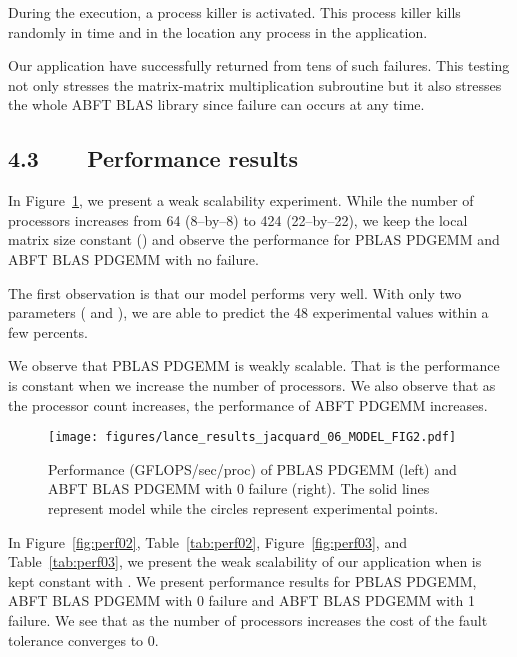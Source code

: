 \documentclass[pdftex,11pt]{article}
\begin{document}
During the execution, a process killer is activated.  This process
killer kills randomly in time and in the location any process in the
application.

Our application have successfully returned from tens of such failures.
This testing not only stresses the matrix-matrix multiplication
subroutine but it also stresses the whole ABFT BLAS library since
failure can occurs at any time.


\subsection*{\color{DodgerBlue4} 4.3~~~~Performance results}

In Figure~\ref{fig:perf01}, we present a weak scalability experiment.
While the number of processors increases from 64 (8--by--8) to 424
(22--by--22), we keep the local matrix size constant () and observe the performance for PBLAS PDGEMM and ABFT
BLAS PDGEMM with no failure.

The first observation is that our model performs very well. With only
two parameters ( and ), we are able to predict the 48
experimental values within a few percents.

We observe that PBLAS PDGEMM is weakly scalable. That is the
performance is constant when we increase the number of processors. We
also observe that as the processor count increases, the performance of
ABFT PDGEMM increases.

\begin{figure}
  \color{DodgerBlue4}
  \begin{center}
    \texttt{[image: figures/lance\_results\_jacquard\_06\_MODEL\_FIG2.pdf]}
    \color{DodgerBlue4}
    \caption{\label{fig:perf01} \color{black} Performance
      (GFLOPS/sec/proc) of PBLAS PDGEMM (left) and ABFT BLAS PDGEMM
      with 0 failure (right).  The solid lines represent model while
      the circles represent experimental points.  }
  \end{center}
\end{figure}

In Figure~\ref{fig:perf02}, Table~\ref{tab:perf02},
Figure~\ref{fig:perf03}, and Table~\ref{tab:perf03}, we present the
weak scalability of our application when  is kept constant with
. We present performance results for PBLAS PDGEMM, ABFT
BLAS PDGEMM with 0 failure and ABFT BLAS PDGEMM with 1 failure.  We
see that as the number of processors increases the cost of the fault
tolerance converges to 0.
\end{document}
